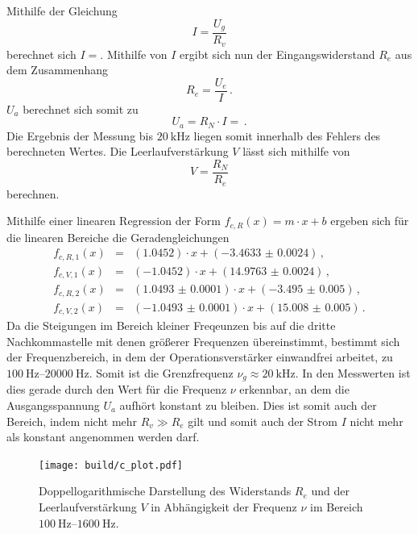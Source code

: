 Mithilfe der Gleichung
\begin{equation*}
    I = \frac{U_g}{R_v}
\end{equation*}
berechnet sich $I = $.
Mithilfe von $I$ ergibt sich nun der Eingangswiderstand $R_e$ aus dem Zusammenhang
\begin{equation*}
    R_e = \frac{U_e}{I}\,.
\end{equation*}
$U_a$ berechnet sich somit zu
\begin{equation*}
    U_a = R_N \cdot I =  \,.
\end{equation*}
Die Ergebnis der Messung bis $\SI{20}{\kilo\hertz}$ liegen somit innerhalb des Fehlers des berechneten Wertes.
Die Leerlaufverstärkung $V$ lässt sich mithilfe von 
\begin{equation*}
    V = \frac{R_N}{R_e}
\end{equation*}
berechnen.

Mithilfe einer linearen Regression der Form $f_{c,R}(x) = m \cdot x + b$ ergeben sich für die linearen Bereiche die Geradengleichungen 
\begin{eqnarray*}
    f_{c,R,1}(x) &=& (\num{1.0452}) \cdot x + (\num{-3.4633(24)}) \,, \\
    f_{c,V,1}(x) &=& (\num{-1.0452}) \cdot x + (\num{14.9763(24)}) \,, \\
    f_{c,R,2}(x) &=& (\num{1.0493(1)}) \cdot x + (\num{-3.495(5)}) \,, \\
    f_{c,V,2}(x) &=& (\num{-1.0493(1)}) \cdot x + (\num{15.008(5)}) \,.
\end{eqnarray*}
Da die Steigungen im Bereich kleiner Freqeunzen bis auf die dritte Nachkommastelle mit denen größerer Frequenzen übereinstimmt, bestimmt sich der Frequenzbereich, in dem der Operationsverstärker einwandfrei arbeitet, zu $\SIrange{100}{20000}{\hertz}$.
Somit ist die Grenzfrequenz $\nu_g \approx \SI{20}{\kilo\hertz}$.
In den Messwerten ist dies gerade durch den Wert für die Frequenz $\nu$ erkennbar, an dem die Ausgangsspannung $U_a$ aufhört konstant zu bleiben.
Dies ist somit auch der Bereich, indem nicht mehr $R_v \gg R_e$ gilt und somit auch der Strom $I$ nicht mehr als konstant angenommen werden darf.

\begin{figure}[h!]
    \centering
    \texttt{[image: build/c\_plot.pdf]}
    \caption{Doppellogarithmische Darstellung des Widerstands $R_e$ und der Leerlaufverstärkung $V$ in Abhängigkeit der Frequenz $\nu$ im Bereich $\SIrange{100}{1600}{\hertz}$.}
    \label{fig:c_plot}
\end{figure}

